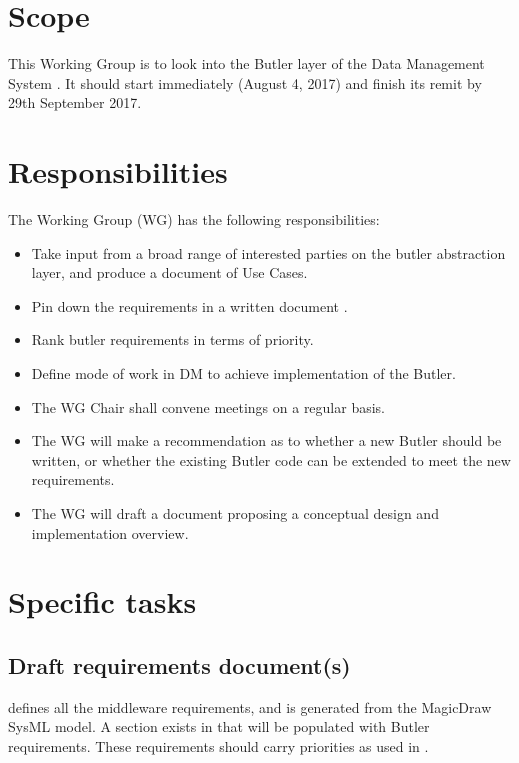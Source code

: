 \section{Scope}

This Working Group is to look into the Butler layer of the Data Management System .
It should start immediately (August 4, 2017) and finish its remit by 29th September 2017.


\section{Responsibilities}

The Working Group (WG) has the following responsibilities:

\begin{itemize}
 \item Take input from a broad range of interested parties on the butler abstraction layer, and produce a document of Use Cases.
 \item Pin down the requirements in a written document .
 \item Rank butler requirements in terms of priority.
 \item Define mode of work in DM to achieve implementation of the Butler.
 \item The WG Chair shall convene meetings on a regular basis.
 \item The WG will make a recommendation as to whether a new Butler should be written, or whether the existing Butler code can be extended to meet the new requirements.
 \item The WG will draft a document proposing a conceptual design and implementation overview.
\end{itemize}

\section{Specific tasks}

\subsection{Draft requirements document(s)}

 defines all the middleware requirements, and is generated from the MagicDraw SysML model.
A section exists in  that will be populated with Butler requirements.
These requirements should carry priorities as used in .

